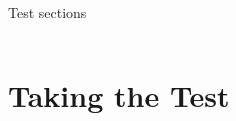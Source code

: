 \begin{frame}{Test sections}
\begin{columns}[onlytextwidth]
    \end{columns}
\end{frame}

\section{Taking the Test}
{
    \frame{\mysectionpage}
}


